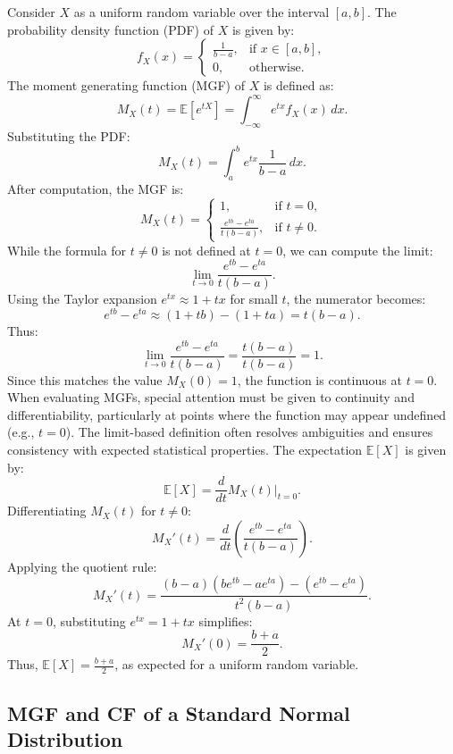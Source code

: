     Consider \( X \) as a uniform random variable over the interval \([a, b]\). The probability density function (PDF) of \( X \) is given by:
    \[
    f_X(x) = 
    \begin{cases} 
    \frac{1}{b-a}, & \text{if } x \in [a, b], \\
    0, & \text{otherwise}.
    \end{cases}
    \]
    The moment generating function (MGF) of \( X \) is defined as:
    \[
    M_X(t) = \mathbb{E}[e^{tX}] = \int_{-\infty}^{\infty} e^{tx} f_X(x) \, dx.
    \]
    Substituting the PDF:
    \[
    M_X(t) = \int_a^b e^{tx} \frac{1}{b-a} \, dx.
    \]
    After computation, the MGF is:
    \[
    M_X(t) = 
    \begin{cases} 
    1, & \text{if } t = 0, \\
    \frac{e^{tb} - e^{ta}}{t(b-a)}, & \text{if } t \neq 0.
    \end{cases}
    \]
    While the formula for \( t \neq 0 \) is not defined at \( t = 0 \), we can compute the limit:
    \[
    \lim_{t \to 0} \frac{e^{tb} - e^{ta}}{t(b-a)}.
    \]
    Using the Taylor expansion \( e^{tx} \approx 1 + tx \) for small \( t \), the numerator becomes:
    \[
    e^{tb} - e^{ta} \approx (1 + tb) - (1 + ta) = t(b-a).
    \]
    Thus:
    \[
    \lim_{t \to 0} \frac{e^{tb} - e^{ta}}{t(b-a)} = \frac{t(b-a)}{t(b-a)} = 1.
    \]
    Since this matches the value \( M_X(0) = 1 \), the function is continuous at \( t = 0 \). \newline When evaluating MGFs, special attention must be given to continuity and differentiability, particularly at points where the function may appear undefined (e.g., \( t = 0 \)). The limit-based definition often resolves ambiguities and ensures consistency with expected statistical properties. \newline
    The expectation \( \mathbb{E}[X] \) is given by:
    \[
    \mathbb{E}[X] = \frac{d}{dt} M_X(t) \Big|_{t=0}.
    \]
    Differentiating \( M_X(t) \) for \( t \neq 0 \):
    \[
    M_X'(t) = \frac{d}{dt} \left( \frac{e^{tb} - e^{ta}}{t(b-a)} \right).
    \]
    Applying the quotient rule:
    \[
    M_X'(t) = \frac{(b-a)(be^{tb} - ae^{ta}) - (e^{tb} - e^{ta})}{t^2(b-a)}.
    \]
    At \( t = 0 \), substituting \( e^{tx} = 1 + tx \) simplifies:
    \[
    M_X'(0) = \frac{b+a}{2}.
    \]
    Thus, \( \mathbb{E}[X] = \frac{b+a}{2} \), as expected for a uniform random variable.
    
    \subsection{MGF and CF of a Standard Normal Distribution}
    
